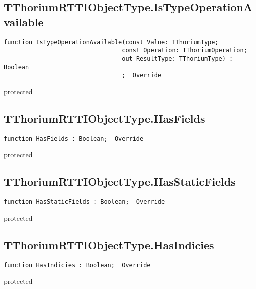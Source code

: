 \subsection{TThoriumRTTIObjectType.IsTypeOperationAvailable}
\label{thoriumcorepkg:thorium:tthoriumrttiobjecttype:istypeoperationavailable}
\begin{FPCList}
\Declaration 

\begin{verbatim}
function IsTypeOperationAvailable(const Value: TThoriumType;
                                 const Operation: TThoriumOperation;
                                 out ResultType: TThoriumType) : Boolean
                                 ;  Override
\end{verbatim}
\Visibility
protected
\end{FPCList}
\subsection{TThoriumRTTIObjectType.HasFields}
\label{thoriumcorepkg:thorium:tthoriumrttiobjecttype:hasfields}
\begin{FPCList}
\Declaration 

\begin{verbatim}
function HasFields : Boolean;  Override
\end{verbatim}
\Visibility
protected
\end{FPCList}
\subsection{TThoriumRTTIObjectType.HasStaticFields}
\label{thoriumcorepkg:thorium:tthoriumrttiobjecttype:hasstaticfields}
\begin{FPCList}
\Declaration 

\begin{verbatim}
function HasStaticFields : Boolean;  Override
\end{verbatim}
\Visibility
protected
\end{FPCList}
\subsection{TThoriumRTTIObjectType.HasIndicies}
\label{thoriumcorepkg:thorium:tthoriumrttiobjecttype:hasindicies}
\begin{FPCList}
\Declaration 

\begin{verbatim}
function HasIndicies : Boolean;  Override
\end{verbatim}
\Visibility
protected
\end{FPCList}
